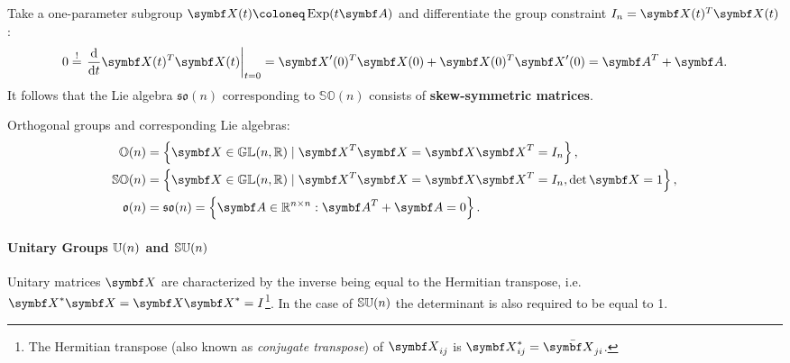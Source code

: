 Take a one-parameter subgroup $\X(t) \coloneq \Exp(t \A)$ and differentiate the group constraint $I_{n} = \X(t) ^{T} \X(t)$:
\begin{equation}
  0 \overset{!}= \left. \frac{\mathrm{d}}{\mathrm{d} t} \X(t)^T \X(t) \right|_{t=0} = \X'(0)^T \X(0) + \X(0)^T \X'(0) = \A^T + \A.
\end{equation}
It follows that the Lie algebra $\mathfrak{so}(n)$ corresponding to $\mathbb{SO}(n)$ consists of \textbf{skew-symmetric matrices}.
\begin{important}
  Orthogonal groups and corresponding Lie algebras:
  \begin{subequations}
    \begin{align}
      \label{eq:On}
      \On             & = \left\{ \X \in \GL(n, \mathbb{R}) \mid \X^{T} \X = \X \X^{T}= I_{n} \right\},              \\
      \label{eq:SOn}
      \SOn            & = \left\{ \X \in \GL(n, \mathbb{R}) \mid \X^{T} \X = \X \X^{T}= I_{n}, \det \X = 1 \right\}, \\
      \label{eq:son}
      \mathfrak{o}(n) & = \mathfrak{so}(n) = \left\{ \A \in \mathbb{R}^{n \times n} : \A^T + \A = 0 \right\}.
    \end{align}
  \end{subequations}
\end{important}

\paragraph{Unitary Groups ${\mathbb{U}(n)}$ and ${\mathbb{SU}(n)}$}

Unitary matrices $\X$ are characterized by the inverse being equal to the Hermitian transpose, i.e. $\X^{*} \X = \X \X^{*} = I$\footnote{The Hermitian transpose (also known as \emph{conjugate transpose}) of $\X_{ij}$ is $\X_{ij}^* = \bar {\X_{ji}}$.}. In the case of ${\mathbb{SU}(n)}$ the determinant is also required to be equal to 1.

